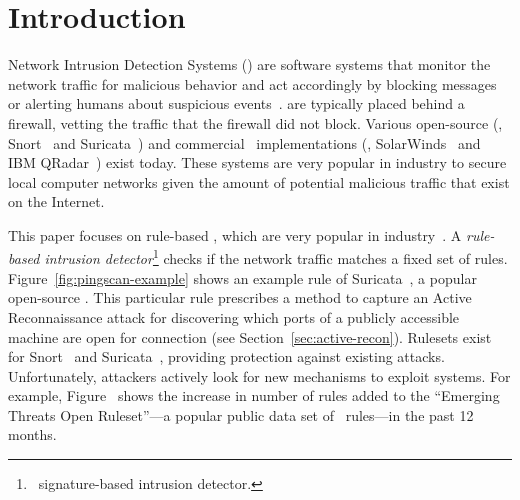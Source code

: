 \documentclass[sigconf,review, anonymous]{acmart}
\begin{document}


\maketitle

\section{Introduction}
\label{sec:intro}

Network Intrusion Detection Systems (\nids{}) are software systems
that monitor the network traffic for malicious behavior and act
accordingly by blocking messages or alerting humans about suspicious
events~\cite{Mitchell:2014:SID:2597757.2542049}. \nids{} are typically
placed behind a firewall, vetting the traffic that the firewall did
not block. Various open-source (\eg{}, Snort~\cite{snort} and
Suricata~\cite{suricata}) and commercial \nids\ implementations (\eg{},
SolarWinds~\cite{solarwinds} and IBM QRadar~\cite{qradar}) exist
today. These systems are very popular in industry to secure local
computer networks given the amount of potential malicious traffic that
exist on the Internet.

This paper focuses on rule-based \nids{}, which are very popular in
industry~\cite{proofpoint-etpro,snort-rule-subscriptions}. A
\emph{rule-based intrusion detector}\footnote{\aka\ signature-based
  intrusion detector.} checks if the network traffic matches a fixed
set of rules. Figure~\ref{fig:pingscan-example} shows an example rule
of Suricata~\cite{suricata}, a popular open-source \nids{}. This
particular rule prescribes a method to capture an Active
Reconnaissance attack for discovering which ports of a publicly
accessible machine are open for connection (see
Section~\ref{sec:active-recon}). Rulesets exist for Snort~\cite{snort}
and Suricata~\cite{suricata}, providing protection against existing
attacks. Unfortunately, attackers actively look for new mechanisms to
exploit systems. For example, Figure~ shows the increase in
number of rules added to the ``Emerging Threats Open Ruleset''---a
popular public data set of \suri\ rules---in the past 12 months.
\end{document}
